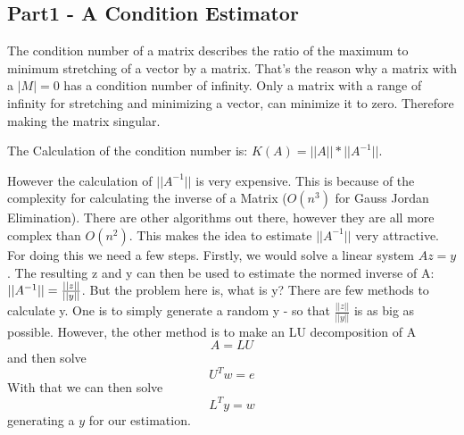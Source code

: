 \documentclass{article}
\begin{document}
\par\noindent

\subsection{Part1 - A Condition Estimator}
The condition number of a matrix describes the ratio of the maximum to minimum stretching of a vector by a matrix. That's the reason why a matrix with a \(|M| = 0\)  has a condition number of infinity.
Only a matrix with a range of infinity for stretching and minimizing a vector, can minimize it to zero. Therefore making the matrix singular.
\par\noindent
The Calculation of the condition number is:
\(K(A) = ||A|| * ||A^{-1}||\).
\par\noindent
However the calculation of \(||A^{-1}||\) is very expensive. This is because of the complexity for calculating the inverse of a Matrix ($O(n^3)$ for Gauss Jordan Elimination).
There are other algorithms out there, however they are all more complex than $O(n^2)$.
This makes the idea to estimate  \(||A^{-1}||\) very attractive. For doing this we need a few steps.
Firstly, we would solve a linear system \(A z = y\).
The resulting z and y can then be used to estimate the normed inverse of A: \(\\||A^{-1}|| = \frac{||z||}{||y||}\).
But the problem here is, what is y? 
There are few methods to calculate y. One is to simply generate a random y - so that \(\frac{||z||}{||y||}\) is as big as possible.
However, the other method is to make an LU decomposition of A 
\begin{equation}
    A = L U
\end{equation}
and then solve 
\begin{equation}
    U^T w = e
\end{equation}
With that we can then solve 
\begin{equation}
    L^T y = w
\end{equation}
generating a \(y\) for our estimation.
\end{document}
